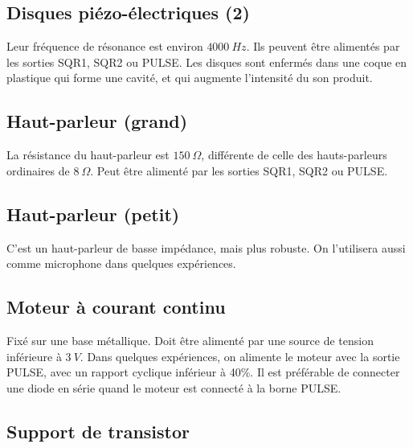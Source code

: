 \documentclass{book}
\begin{document}
\subsection{Disques piézo-électriques (2)}





Leur fréquence de résonance est environ $4000\ Hz$. Ils peuvent être alimentés par les sorties SQR1, SQR2 ou PULSE. Les disques sont enfermés dans une coque en plastique qui forme une cavité, et qui augmente l'intensité du son produit.




\subsection{Haut-parleur (grand)}





La résistance du haut-parleur est $150\ \Omega$, différente de celle des hauts-parleurs ordinaires de $8\ \Omega$. Peut être alimenté par les sorties SQR1, SQR2 ou PULSE.




\subsection{Haut-parleur (petit)}





C'est un haut-parleur de basse impédance, mais plus robuste. On l'utilisera aussi comme microphone dans quelques expériences.




\subsection{Moteur à courant continu}





Fixé sur une base métallique. Doit être alimenté par une source de tension inférieure à $3\ V$. Dans quelques expériences, on alimente le moteur avec la sortie PULSE, avec un rapport cyclique inférieur à 40\%{}. Il est préférable de connecter une diode en série quand le moteur est connecté à la borne PULSE.




\subsection{Support de transistor}
\end{document}
